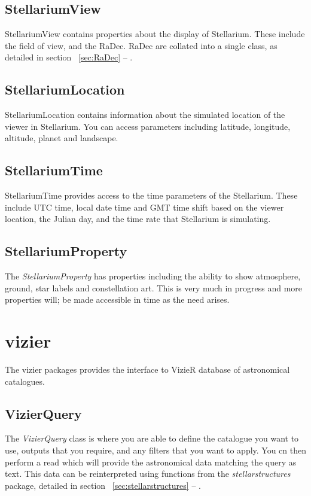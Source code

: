 \subsection{StellariumView}
StellariumView contains properties about the display of Stellarium. These include the field of view, and the RaDec. RaDec are collated into a single class, as detailed in section ~\ref{sec:RaDec} --
\emph{}. 

\subsection{StellariumLocation}
StellariumLocation contains information about the simulated location of the viewer in Stellarium. You can access parameters including latitude, longitude, altitude, planet and landscape.

\subsection{StellariumTime}
StellariumTime provides access to the time parameters of the Stellarium.  These include UTC time, local date time and GMT time shift based on the viewer location, the Julian day, and the time rate that Stellarium is simulating.

\subsection{StellariumProperty}
The \textit{StellariumProperty} has properties including the ability to show atmosphere, ground, star labels and constellation art. This is very much in progress and more properties will; be made accessible in time as the need arises.

\section{vizier}
The vizier packages provides the interface to  VizieR database of astronomical catalogues. 
\subsection{VizierQuery}
The \textit{VizierQuery} class is where you are able to define the catalogue you want to use, outputs that you require, and any filters that you want to apply. You cn then perform a read which will provide the astronomical data matching the query as text. This data can be reinterpreted using functions from the \textit{stellarstructures} package, detailed in   section ~\ref{sec:stellarstructures} --
\emph{}. 

